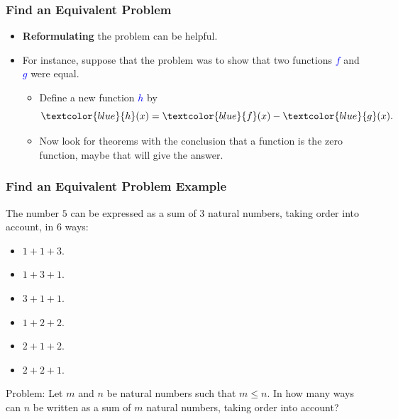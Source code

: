 \documentclass{beamer}
\begin{document}
\begin{frame}%
\frametitle{Find an Equivalent Problem}

\begin{itemize}

\item \textbf{Reformulating} the problem can be helpful.

\vspace{0.5cm}

\item<2-> For instance, suppose that the problem was to
show that two functions \textcolor{blue}{$f$} and \textcolor{blue}{$g$} were equal.
\begin{itemize}
\item<2-> Define a new function \textcolor{blue}{$h$} by
$$
\textcolor{blue}{h}(x) = \textcolor{blue}{f}(x) - \textcolor{blue}{g}(x).
$$


\item<2-> Now look for theorems with the conclusion that a function is the zero function, maybe
that will give the answer.

\end{itemize}

\end{itemize}

\end{frame}

\begin{frame}%
\frametitle{Find an Equivalent Problem Example}

The number $5$ can be expressed as a sum of $3$ natural numbers, taking order into account, in $6$ ways:
\begin{itemize}
\item<2-> $1 + 1 + 3$.

\item<3-> $1 + 3 + 1$.

\item<4-> $3 + 1 + 1$.

\item<5-> $1 + 2 + 2$.

\item<6-> $2 + 1 + 2$.

\item<7-> $2 + 2 + 1$.

\end{itemize}


\begin{mdframed}[style=exampledefault]
Problem: Let $m$ and $n$ be natural numbers such that $m \le n$. In how many ways can $n$ be written as a sum of $m$ natural numbers,
taking order into account?
\end{mdframed}

\end{frame}
\end{document}
